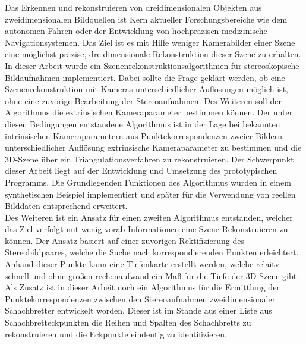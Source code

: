
Das Erkennen und rekonstruieren von dreidimensionalen Objekten aus zweidimensionalen Bildquellen ist Kern aktueller Forschungsbereiche wie dem autonomen Fahren oder der Entwicklung von hochpräzisen medizinische Navigationsystemen. Das Ziel ist es mit Hilfe weniger Kamerabilder einer Szene eine möglichst präzise, dreidimensionale Rekonstruktion dieser Szene zu erhalten.\\

In dieser Arbeit wurde ein Szenenrekonstruktionsalgorithmen für stereoskopische Bildaufnahmen implementiert. Dabei sollte die Frage geklärt werden, ob eine Szenenrekonstruktion mit Kameras unterschiedlicher Auflösungen möglich ist, ohne eine zuvorige Bearbeitung der Stereoaufnahmen. Des Weiteren soll der Algorithmus die extrinsischen Kameraparameter bestimmen können. Der unter diesen Bedingungen entstandene Algorithmus ist in der Lage bei bekannten intrinsischen Kameraparametern aus Punktekorrespondenzen zweier Bildern unterschiedlicher Auflösung extrinsische Kameraparameter zu bestimmen und die 3D-Szene über ein Triangulationsverfahren zu rekonstruieren. Der Schwerpunkt dieser Arbeit liegt auf der Entwicklung und Umsetzung des prototypischen Programms. Die Grundlegenden Funktionen des Algorithmus wurden in einem synthetischen Beispiel implementiert und später für die Verwendung von reellen Bilddaten entsprechend erweitert. \\

Des Weiteren ist ein Ansatz für einen zweiten Algorithmus entstanden, welcher das Ziel verfolgt mit wenig vorab Informationen eine Szene Rekonstruieren zu können. Der Ansatz basiert auf einer zuvorigen Rektifizierung des Stereobildpaares, welche die Suche nach korrespondierenden Punkten erleichtert. Anhand dieser Punkte kann eine Tiefenkarte erstellt werden, welche relaitv schnell und ohne großen rechenaufwand ein Maß für die Tiefe der 3D-Szene gibt.\\

Als Zusatz ist in dieser Arbeit noch ein Algorithmus für die Ermittlung der Punktekorrespondenzen zwischen den Stereoaufnahmen zweidimensionaler Schachbretter entwickelt worden. Dieser ist im Stande aus einer Liste aus Schachbretteckpunkten die Reihen und Spalten des Schachbretts zu rekonstruieren und die Eckpunkte eindeutig zu identifizieren.




%
%
% 



